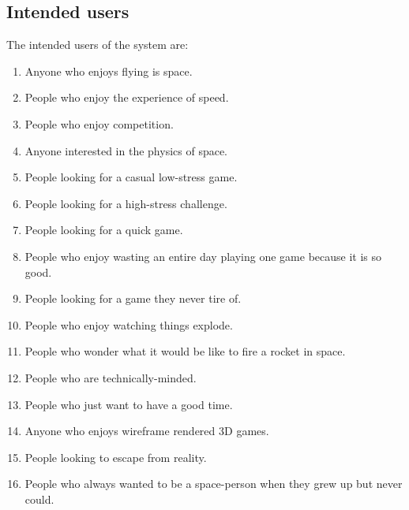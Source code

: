 \subsection*{Intended users}

The intended users of the system are:

\begin{multicols}{2}
\begin{enumerate}

  \item Anyone who enjoys flying is space.

  \item People who enjoy the experience of speed.

  \item People who enjoy competition.

  \item Anyone interested in the physics of space.

  \item People looking for a casual low-stress game.

  \item People looking for a high-stress challenge.

  \item People looking for a quick game.

  \item People who enjoy wasting an entire day playing one game because it is so good.

  \item People looking for a game they never tire of.

  \item People who enjoy watching things explode.

  \item People who wonder what it would be like to fire a rocket in space.

  \item People who are technically-minded.

  \item People who just want to have a good time.

  \item Anyone who enjoys wireframe rendered 3D games.

  \item People looking to escape from reality.

  \item People who always wanted to be a space-person when they grew up but never could.


\end{enumerate}
\end{multicols}
